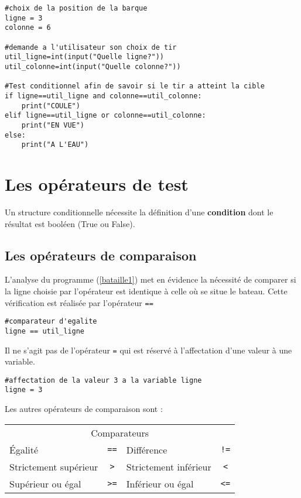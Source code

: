 \begin{lstlisting}[frame=lines, float=ht,caption={Bataille Navale},label=bataille1]
#choix de la position de la barque
ligne = 3
colonne = 6

#demande a l'utilisateur son choix de tir
util_ligne=int(input("Quelle ligne?"))
util_colonne=int(input("Quelle colonne?"))

#Test conditionnel afin de savoir si le tir a atteint la cible
if ligne==util_ligne and colonne==util_colonne:
    print("COULE")
elif ligne==util_ligne or colonne==util_colonne:
    print("EN VUE")
else:
    print("A L'EAU")
\end{lstlisting}

\section{Les opérateurs de test}
Un structure conditionnelle nécessite la définition d'une \textbf{condition} dont le résultat est booléen (True ou False).

\subsection{Les opérateurs de comparaison}

L'analyse du programme (\ref{bataille1}) met en évidence la nécessité de comparer si la ligne choisie par l'opérateur est identique à celle où se situe le bateau. Cette vérification est réalisée par l'opérateur \verb|==|

\begin{lstlisting}
#comparateur d'egalite
ligne == util_ligne 
\end{lstlisting}


Il ne s'agit pas de l'opérateur \verb|=| qui est réservé à l'affectation d'une valeur à une variable.

\begin{lstlisting}
#affectation de la valeur 3 a la variable ligne
ligne = 3 
\end{lstlisting}

Les autres opérateurs de comparaison sont :

\begin{tabular}{lc|lc}
 \multicolumn{4}{c}{Comparateurs} \\
 Égalité &\verb?==? & Différence& \verb?!=? \\
 Strictement supérieur & \verb?>? & Strictement inférieur& \verb?<? \\
 Supérieur ou égal & \verb?>=? & Inférieur ou égal& \verb?<=? \\
\end{tabular}


